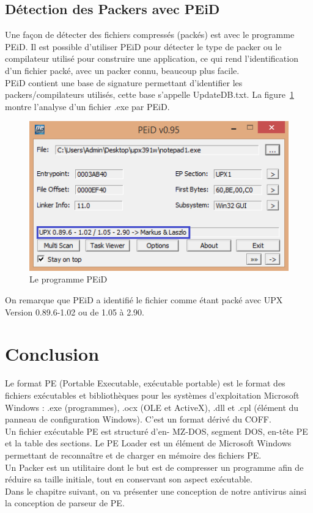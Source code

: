 \subsection{Détection des Packers avec PEiD}
Une façon de détecter des fichiers compressés (packés) est avec le programme PEiD. Il est possible d'utiliser PEiD pour détecter le type de packer ou le compilateur utilisé pour construire une application, ce qui rend l'identification d'un fichier packé, avec un packer connu, beaucoup plus facile.\\
PEiD contient une base de signature permettant d'identifier les packers/compilateurs utilisés, cette base s'appelle UpdateDB.txt.
 La figure~\ref{fig :PEID} montre l'analyse d'un fichier .exe par PEiD.
\begin{figure}[H]
\begin{center}
\includegraphics[scale=0.9]{Figures/PEID.PNG}
\caption{Le programme PEiD}
\label{fig :PEID} 
\end{center}
\end{figure}
On remarque que PEiD a identifié le fichier comme étant packé avec UPX Version 0.89.6-1.02 ou de 1.05 à 2.90.
\newpage
\section{Conclusion}
Le format PE (Portable Executable, exécutable portable) est le format des fichiers exécutables et bibliothèques pour les systèmes d'exploitation Microsoft Windows : .exe (programmes), .ocx (OLE et ActiveX), .dll et .cpl (élément du panneau de configuration Windows). C'est un format dérivé du COFF.\\


Un fichier exécutable PE est structuré d'en- MZ-DOS, segment DOS, en-tête PE et la table des sections. Le PE Loader est un élément de Microsoft Windows permettant de reconnaître et de charger en mémoire des fichiers PE. \\
Un Packer est un utilitaire dont le but est de compresser un programme afin de réduire sa taille initiale, tout en conservant son aspect exécutable.\\

Dans le chapitre suivant, on va présenter une conception de notre antivirus ainsi la conception de parseur de PE.
